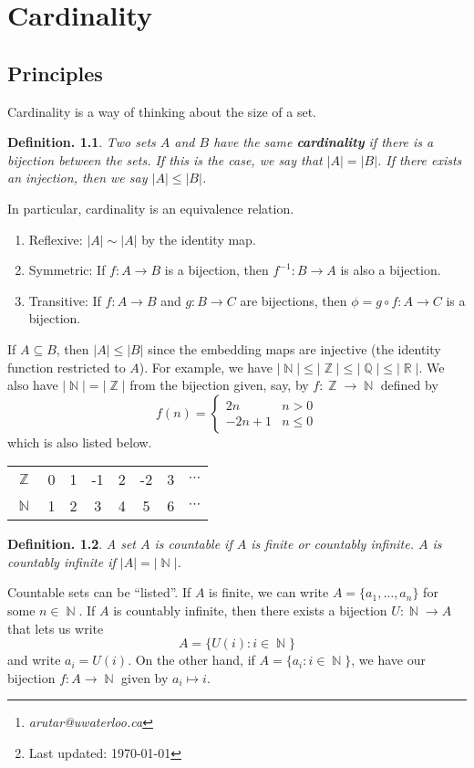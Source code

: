\documentclass[11pt, a4paper]{memoir}
\title{\subject}
\author{Alex Rutar\thanks{\itshape arutar@uwaterloo.ca}\\ University of Waterloo}
\date{\semester\thanks{Last updated: \today}}
\DeclareMathOperator{\N}{{\mathbb{N}}}
\DeclareMathOperator{\Q}{{\mathbb{Q}}}
\DeclareMathOperator{\Z}{{\mathbb{Z}}}
\DeclareMathOperator{\R}{{\mathbb{R}}}
\theoremstyle{change}
\theoremstyle{plain}
\theoremstyle{nonumberplain}
\newtheorem{definition}{Definition.}
\numberwithin{equation}{section}
\begin{document}
\hypersetup{pageanchor=false}
\maketitle
\newpage
\frontmatter
\hypersetup{pageanchor=true}
\tableofcontents*
\newpage
\mainmatter


\chapter{Cardinality}
\section{Principles}
Cardinality is a way of thinking about the size of a set.
\begin{definition}
    Two sets $A$ and $B$ have the same \textbf{cardinality} if there is a bijection between the sets. If this is the case, we
    say that $|A|=|B|$. If there exists an injection, then we say $|A|\leq|B|$.
\end{definition}
In particular, cardinality is an equivalence relation.
\begin{enumerate}
    \item Reflexive: $|A|\sim|A|$ by the identity map.
    \item Symmetric: If $f:A\to B$ is a bijection, then $f^{-1}:B\to A$ is also a bijection.
    \item Transitive: If $f:A\to B$ and $g:B\to C$ are bijections, then $\phi=g\circ f:A\to C$ is a bijection.
\end{enumerate}
If $A\subseteq B$, then $|A|\leq|B|$ since the embedding maps are injective (the identity function restricted to $A$).
For example, we have $|\N|\leq|\Z|\leq|\Q|\leq|\R|$. We also have $|\N|=|\Z|$ from the bijection given, say, by $f:\Z\to\N$
defined by
\[f(n)=
\begin{cases}
    2n & n>0\\
    -2n+1 & n\leq 0
\end{cases}
\]
which is also listed below.
\begin{center}
    \begin{tabular}{cccccccc}
        $\Z$&0&1&-1&2&-2&3&$\cdots$\\
        $\N$&1&2&3 &4&5 &6&$\cdots$
    \end{tabular}
\end{center}
\begin{definition}
    A set $A$ is countable if $A$ is finite or countably infinite. $A$ is countably infinite if $|A|=|\N|$.
\end{definition}
Countable sets can be ``listed''. If $A$ is finite, we can write $A=\{a_1,\dots,a_n\}$ for some $n\in\N$. If $A$ is countably
infinite, then there exists a bijection $U:\N\to A$ that lets us write
\[A=\{U(i):i\in\N\}\]
and write $a_i=U(i)$. On the other hand, if $A=\{a_i:i\in\N\}$, we have our bijection $f:A\to\N$ given by $a_i\mapsto i$.
\end{document}
